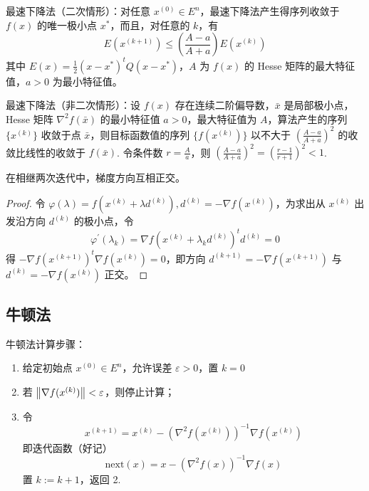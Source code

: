 \begin{note}
    最速下降法（二次情形）：对任意 $x^{(0)} \in E^n$，最速下降法产生得序列收敛于 $f(x)$ 的唯一极小点 $x^*$，而且，对任意的 $k$，有\[E(x^{(k + 1)}) \le \left(\frac{A - a}{A + a}\right)E(x^{(k)})\] 其中 $E(x) = \frac{1}{2}(x - x^*)^tQ(x - x^*)$，$A$ 为 $f(x)$ 的 Hesse 矩阵的最大特征值，$a > 0$ 为最小特征值。

    最速下降法（非二次情形）：设 $f(x)$ 存在连续二阶偏导数，$\bar{x}$ 是局部极小点，Hesse 矩阵 $\nabla^2f(\bar{x})$ 的最小特征值 $a > 0$，最大特征值为 $A$，算法产生的序列 $\{x^{(k)}\}$ 收敛于点 $\bar{x}$，则目标函数值的序列 $\{f(x^{(k)})\}$ 以不大于 $\left(\frac{A - a}{A + a}\right)^2$ 的收敛比线性的收敛于 $f(\bar{x})$. 令条件数 $r = \frac{A}{a}$，则 $\left(\frac{A-a}{A+a}\right)^{2}=\left(\frac{r-1}{r+1}\right)^{2}<1$.
\end{note}

\begin{theorem}
    在相继两次迭代中，梯度方向互相正交。
    \begin{proof}
        令 $\varphi(\lambda) = f(x^{(k)} + \lambda d^{(k)}), d^{(k)} = -\nabla f(x^{(k)})$，为求出从 $x^{(k)}$ 出发沿方向 $d^{(k)}$ 的极小点，令 \[\varphi^\prime(\lambda_k) = \nabla f(x^{(k)} + \lambda_kd^{(k)})^td^{(k)} = 0\] 得 $-\nabla f(x^{(k + 1)})^t\nabla f(x^{(k)}) = 0$，即方向 $d^{(k + 1)} = -\nabla f(x^{(k + 1)})$ 与 $d^{(k)} = -\nabla f(x^{(k)})$ 正交。
    \end{proof}    
\end{theorem}

\subsection{牛顿法}
\begin{note}
    牛顿法计算步骤：\begin{enumerate}
        \item 给定初始点 $x^{(0)} \in E^n$，允许误差 $\varepsilon > 0$，置 $k = 0$
        \item 若 $\norm{\nabla f(x^{(k)})} < \varepsilon$，则停止计算；
        \item 令 
        \[
            x^{(k + 1)} = x^{(k)} - \left(\nabla^2f\left(x^{(k)}\right)\right)^{-1}\nabla f\left(x^{(k)}\right)
        \]
        即迭代函数（好记）
        \[
            \mathrm{next}(x) = x - \left(\nabla^2f(x)\right)^{-1} \nabla f(x)    
        \]
        置 $k:=k + 1$，返回 2.
    \end{enumerate}
\end{note}

